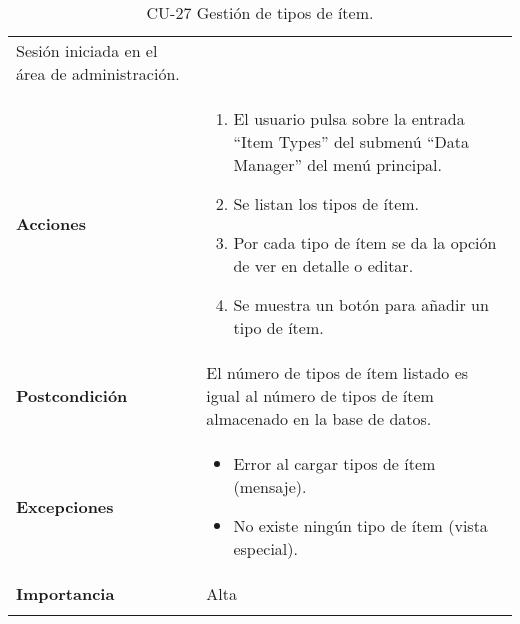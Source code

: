 \begin{longtable}[]{@{}ll@{}}
\begin{minipage}[t]{0.75\columnwidth}
Sesión iniciada en el área de administración.\strut
\end{minipage}\tabularnewline
\begin{minipage}[t]{0.19\columnwidth}\raggedright
\textbf{Acciones}\strut
\end{minipage} & \begin{minipage}[t]{0.75\columnwidth}\raggedright
\begin{enumerate}
\def\labelenumi{\arabic{enumi}.}
\tightlist
\item
  El usuario pulsa sobre la entrada ``Item Types'' del submenú ``Data
  Manager'' del menú principal.
\item
  Se listan los tipos de ítem.
\item
  Por cada tipo de ítem se da la opción de ver en detalle o editar.
\item
  Se muestra un botón para añadir un tipo de ítem.
\end{enumerate}\strut
\end{minipage}\tabularnewline
\begin{minipage}[t]{0.19\columnwidth}\raggedright
\textbf{Postcondición}\strut
\end{minipage} & \begin{minipage}[t]{0.75\columnwidth}\raggedright
El número de tipos de ítem listado es igual al número de tipos de ítem
almacenado en la base de datos.\strut
\end{minipage}\tabularnewline
\begin{minipage}[t]{0.19\columnwidth}\raggedright
\textbf{Excepciones}\strut
\end{minipage} & \begin{minipage}[t]{0.75\columnwidth}\raggedright
\begin{itemize}
\tightlist
\item
  Error al cargar tipos de ítem (mensaje).
\item
  No existe ningún tipo de ítem (vista especial).
\end{itemize}\strut
\end{minipage}\tabularnewline
\begin{minipage}[t]{0.19\columnwidth}\raggedright
\textbf{Importancia}\strut
\end{minipage} & \begin{minipage}[t]{0.75\columnwidth}\raggedright
Alta\strut
\end{minipage}\tabularnewline
\bottomrule
\caption{CU-27 Gestión de tipos de ítem.}
\end{longtable}

